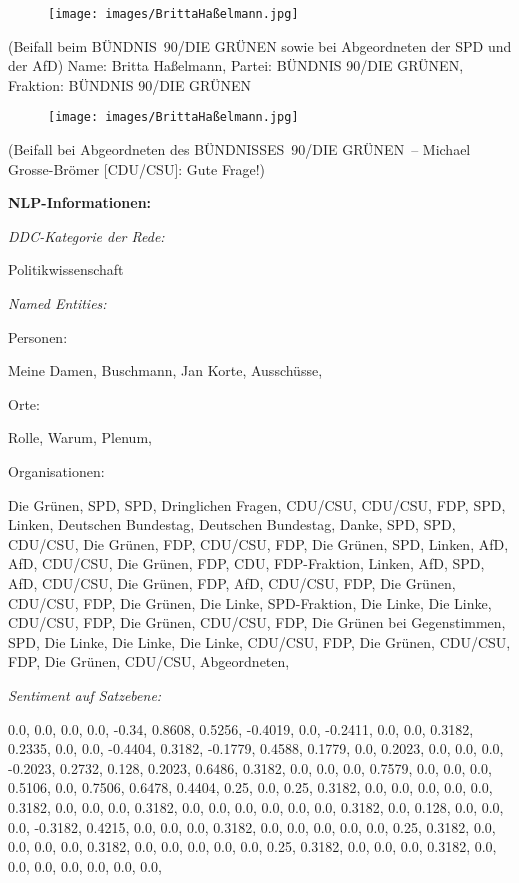 \documentclass[10pt, a4paper]{report}
\begin{document}
\begin{figure}[!ht]
\texttt{[image: images/BrittaHaßelmann.jpg]}
\end{figure}


(Beifall beim BÜNDNIS 90/DIE GRÜNEN sowie bei Abgeordneten der SPD und der AfD)
Name: Britta Haßelmann, Partei: BÜNDNIS 90/DIE GRÜNEN, Fraktion: BÜNDNIS 90/DIE GRÜNEN

\begin{figure}[!ht]
\texttt{[image: images/BrittaHaßelmann.jpg]}
\end{figure}


(Beifall bei Abgeordneten des BÜNDNISSES 90/DIE GRÜNEN – Michael Grosse-Brömer [CDU/CSU]: Gute Frage!)


\textbf{NLP-Informationen:}

\textit{DDC-Kategorie der Rede:}

Politikwissenschaft

\textit{Named Entities:}

Personen:

Meine Damen, Buschmann, Jan Korte, Ausschüsse, 

Orte:

Rolle, Warum, Plenum, 

Organisationen:

Die Grünen, SPD, SPD, Dringlichen Fragen, CDU/CSU, CDU/CSU, FDP, SPD, Linken, Deutschen Bundestag, Deutschen Bundestag, Danke, SPD, SPD, CDU/CSU, Die Grünen, FDP, CDU/CSU, FDP, Die Grünen, SPD, Linken, AfD, AfD, CDU/CSU, Die Grünen, FDP, CDU, FDP-Fraktion, Linken, AfD, SPD, AfD, CDU/CSU, Die Grünen, FDP, AfD, CDU/CSU, FDP, Die Grünen, CDU/CSU, FDP, Die Grünen, Die Linke, SPD-Fraktion, Die Linke, Die Linke, CDU/CSU, FDP, Die Grünen, CDU/CSU, FDP, Die Grünen bei Gegenstimmen, SPD, Die Linke, Die Linke, Die Linke, CDU/CSU, FDP, Die Grünen, CDU/CSU, FDP, Die Grünen, CDU/CSU, Abgeordneten, 

\textit{Sentiment auf Satzebene:}

0.0, 0.0, 0.0, 0.0, -0.34, 0.8608, 0.5256, -0.4019, 0.0, -0.2411, 0.0, 0.0, 0.3182, 0.2335, 0.0, 0.0, -0.4404, 0.3182, -0.1779, 0.4588, 0.1779, 0.0, 0.2023, 0.0, 0.0, 0.0, -0.2023, 0.2732, 0.128, 0.2023, 0.6486, 0.3182, 0.0, 0.0, 0.0, 0.7579, 0.0, 0.0, 0.0, 0.5106, 0.0, 0.7506, 0.6478, 0.4404, 0.25, 0.0, 0.25, 0.3182, 0.0, 0.0, 0.0, 0.0, 0.0, 0.3182, 0.0, 0.0, 0.0, 0.3182, 0.0, 0.0, 0.0, 0.0, 0.0, 0.0, 0.3182, 0.0, 0.128, 0.0, 0.0, 0.0, -0.3182, 0.4215, 0.0, 0.0, 0.0, 0.3182, 0.0, 0.0, 0.0, 0.0, 0.0, 0.25, 0.3182, 0.0, 0.0, 0.0, 0.0, 0.3182, 0.0, 0.0, 0.0, 0.0, 0.0, 0.25, 0.3182, 0.0, 0.0, 0.0, 0.3182, 0.0, 0.0, 0.0, 0.0, 0.0, 0.0, 0.0, 
\end{document}
